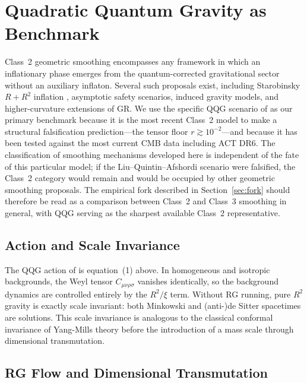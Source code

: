 \documentclass[12pt, a4paper]{article}
\begin{document}
\section{Quadratic Quantum Gravity as Benchmark}
\label{sec:qqg}

Class~2 geometric smoothing encompasses any framework in which an inflationary
phase emerges from the quantum-corrected gravitational sector without an auxiliary
inflaton. Several such proposals exist, including Starobinsky $R + R^2$ inflation
\citep{Starobinsky1980}, asymptotic safety scenarios, induced gravity models, and
higher-curvature extensions of GR. We use the specific QQG scenario of
\citet{Liu2026} as our primary benchmark because it is the most recent Class~2
model to make a structural falsification prediction---the tensor floor $r \gtrsim
10^{-2}$---and because it has been tested against the most current CMB data
including ACT DR6. The classification of smoothing mechanisms developed here is
independent of the fate of this particular model; if the Liu--Quintin--Afshordi
scenario were falsified, the Class~2 category would remain and would be occupied
by other geometric smoothing proposals. The empirical fork described in
Section~\ref{sec:fork} should therefore be read as a comparison between Class~2
and Class~3 smoothing in general, with QQG serving as the sharpest available
Class~2 representative.

\subsection{Action and Scale Invariance}

The QQG action of \citet{Liu2026} is equation~(1) above. In homogeneous and
isotropic backgrounds, the Weyl tensor $C_{\mu\nu\rho\sigma}$ vanishes identically,
so the background dynamics are controlled entirely by the $R^2/\xi$ term. Without
RG running, pure $R^2$ gravity is exactly scale invariant: both Minkowski and
(anti-)de Sitter spacetimes are solutions. This scale invariance is analogous to
the classical conformal invariance of Yang-Mills theory before the introduction of
a mass scale through dimensional transmutation.

\subsection{RG Flow and Dimensional Transmutation}
\end{document}
